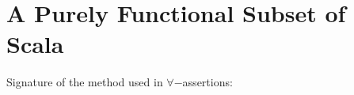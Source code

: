 \section{A Purely Functional Subset of Scala}

Signature of the method used in $\forall-$assertions:


